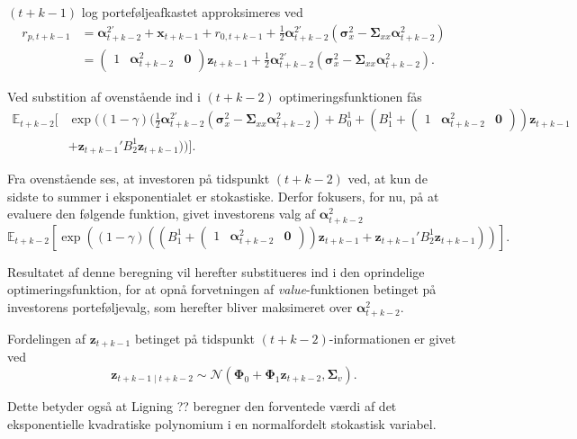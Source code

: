 \documentclass[
  a4paper,
  oneside]{memoir}
\begin{document}
\((t+k-1)\) log porteføljeafkastet approksimeres ved
\begin{align*}
r_{p,t+k-1}&=\bm{\alpha}_{t+k-2}^{2\prime} + \bm{x}_{t+k-1} + r_{0,t+k-1} + \frac{1}{2} \bm{\alpha}_{t+k-2}^{2\prime} (\bm{\sigma}_x^2 - \bm{\Sigma}_{xx} \bm{\alpha}_{t+k-2}^{2})\\
           &=\begin{pmatrix} 1 & \bm{\alpha}_{t+k-2}^{2} & \bm{0}\end{pmatrix} \bm{z}_{t+k-1} + \frac{1}{2}\bm{\alpha}_{t+k-2}^{2\prime} (\bm{\sigma}_x^2 - \bm{\Sigma}_{xx} \bm{\alpha}_{t+k-2}^{2}).
\end{align*}

Ved substition af ovenstående ind i \((t+k-2)\) optimeringsfunktionen fås
\begin{align*}
\mathbb{E}_{t+k-2}[&\exp((1-\gamma)  (\frac{1}{2}\bm{\alpha}_{t+k-2}^{2\prime} (\bm{\sigma}_x^2 - \bm{\Sigma}_{xx} \bm{\alpha}_{t+k-2}^{2}) + B_0^1 + (B_1^1 + \begin{pmatrix} 1 & \bm{\alpha}_{t+k-2}^{2} & \bm{0}\end{pmatrix} ) \bm{z}_{t+k-1}\\
                   &+ \bm{z}_{t+k-1}'B_2^1 \bm{z}_{t+k-1} ))].
\end{align*}

Fra ovenstående ses, at investoren på tidspunkt \((t+k-2)\) ved, at kun de sidste to summer i eksponentialet er stokastiske. Derfor fokusers, for nu, på at evaluere den følgende funktion, givet investorens valg af \(\bm{\alpha}_{t+k-2}^{2}\)
\[\mathbb{E}_{t+k-2}[ \exp( (1-\gamma) ((B_1^1 + \begin{pmatrix} 1 & \bm{\alpha}_{t+k-2}^{2} & \bm{0}\end{pmatrix} ) \bm{z}_{t+k-1} + \bm{z}_{t+k-1}'B_2^1 \bm{z}_{t+k-1}  )) ].\]

Resultatet af denne beregning vil herefter substitueres ind i den oprindelige optimeringsfunktion, for at opnå forvetningen af \emph{value}-funktionen betinget på investorens porteføljevalg, som herefter bliver maksimeret over \(\bm{\alpha}_{t+k-2}^{2}\).

Fordelingen af \(\bm{z}_{t+k-1}\) betinget på tidspunkt \((t+k-2)\)-informationen er givet ved
\[\bm{z}_{t+k-1\mid t+k-2}\sim\mathcal{N}(\bm{\Phi}_0+\bm{\Phi}_1\bm{z}_{t+k-2},\bm{\Sigma}_v).\]

Dette betyder også at Ligning ?? beregner den forventede værdi af det eksponentielle kvadratiske polynomium i en normalfordelt stokastisk variabel.
\end{document}
